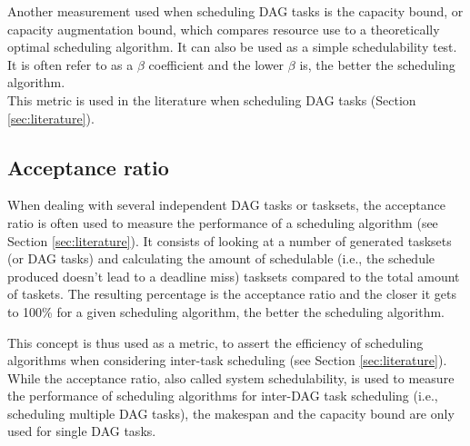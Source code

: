 Another measurement used when scheduling DAG tasks  
is the capacity bound, or capacity augmentation bound,
which compares resource use to a theoretically optimal scheduling algorithm.
It can also be used as a simple schedulability test.
It is often refer to as a $\beta$ coefficient and the lower $\beta$ is, the better the scheduling algorithm.\\
This metric is used in the literature when scheduling DAG tasks (Section \ref{sec:literature}).

%
%

\subsection{Acceptance ratio}

When dealing with several independent DAG tasks
or tasksets, 
the acceptance ratio is often used to measure the 
performance of a scheduling algorithm (see Section \ref{sec:literature}).
It consists of looking at a number of generated tasksets (or DAG tasks)
and calculating the amount of schedulable (i.e., 
the schedule produced doesn't lead to a deadline miss) tasksets compared to 
the total amount of taskets.
The resulting percentage is the acceptance ratio 
and the closer it gets to 100\% for a given scheduling algorithm, the better the scheduling algorithm.

This concept is thus used as a metric, to assert the efficiency
of scheduling algorithms when considering inter-task scheduling (see Section \ref{sec:literature}).
\\


While the acceptance ratio, also called system schedulability, is used 
to measure the performance of scheduling algorithms for inter-DAG task scheduling
(i.e., scheduling multiple DAG tasks),
the makespan and the capacity bound are only used for single DAG tasks.

